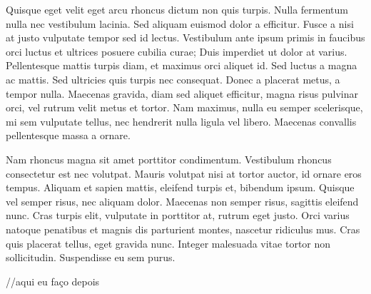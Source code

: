 \documentclass[a4paper]{article}
\begin{document}
    \begin{answer}
        Quisque eget velit eget arcu rhoncus dictum non quis turpis. Nulla fermentum nulla nec vestibulum lacinia. Sed aliquam euismod dolor a efficitur. Fusce a nisi at justo vulputate tempor sed id lectus. Vestibulum ante ipsum primis in faucibus orci luctus et ultrices posuere cubilia curae; Duis imperdiet ut dolor at varius. Pellentesque mattis turpis diam, et maximus orci aliquet id. Sed luctus a magna ac mattis. Sed ultricies quis turpis nec consequat. Donec a placerat metus, a tempor nulla. Maecenas gravida, diam sed aliquet efficitur, magna risus pulvinar orci, vel rutrum velit metus et tortor. Nam maximus, nulla eu semper scelerisque, mi sem vulputate tellus, nec hendrerit nulla ligula vel libero. Maecenas convallis pellentesque massa a ornare.

        Nam rhoncus magna sit amet porttitor condimentum. Vestibulum rhoncus consectetur est nec volutpat. Mauris volutpat nisi at tortor auctor, id ornare eros tempus. Aliquam et sapien mattis, eleifend turpis et, bibendum ipsum. Quisque vel semper risus, nec aliquam dolor. Maecenas non semper risus, sagittis eleifend nunc. Cras turpis elit, vulputate in porttitor at, rutrum eget justo. Orci varius natoque penatibus et magnis dis parturient montes, nascetur ridiculus mus. Cras quis placerat tellus, eget gravida nunc. Integer malesuada vitae tortor non sollicitudin. Suspendisse eu sem purus.
    \end{answer}

    \begin{answer}
        //aqui eu faço depois
    \end{answer}
\end{document}
